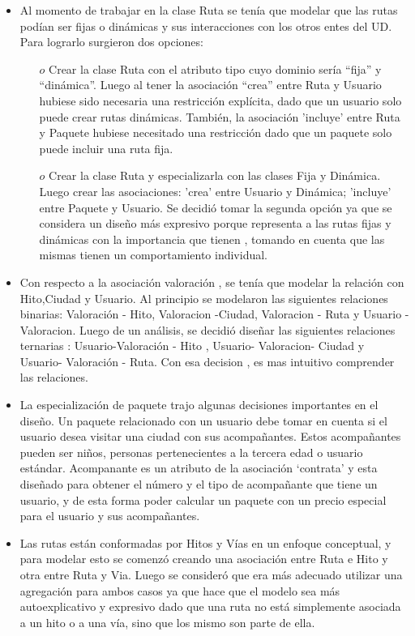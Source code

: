 \documentclass[a4paper]{article}
\begin{document}
\begin{itemize}

\item  Al momento de trabajar en la clase Ruta se tenía que modelar que las rutas podían ser fijas o dinámicas y sus interacciones con los otros entes del UD. Para lograrlo surgieron dos opciones:

\begin{itemize}
\item[$o$] Crear la clase Ruta con el atributo tipo cuyo dominio sería “fija” y “dinámica”. Luego al tener la asociación “crea” entre Ruta y Usuario hubiese sido necesaria una restricción explícita, dado que un usuario solo puede crear rutas dinámicas. También, la asociación 'incluye' entre Ruta y Paquete hubiese necesitado una restricción dado que un paquete solo puede incluir una ruta fija.
\item[$o$] Crear la clase Ruta y especializarla con las clases Fija y Dinámica. Luego crear las asociaciones: 'crea' entre Usuario y Dinámica; 'incluye' entre Paquete y Usuario. Se decidió tomar la segunda opción ya que se considera un diseño más expresivo porque representa a las rutas fijas y dinámicas con la importancia que tienen , tomando en cuenta que las mismas tienen un comportamiento individual.

\end{itemize}
\item  Con respecto a la asociación valoración , se tenía que modelar la relación con Hito,Ciudad y Usuario. Al principio se modelaron las siguientes relaciones binarias: Valoración - Hito, Valoracion -Ciudad, Valoracion - Ruta y Usuario -Valoracion. Luego de un análisis, se decidió diseñar las siguientes relaciones ternarias : Usuario-Valoración - Hito , Usuario- Valoracion- Ciudad y Usuario- Valoración - Ruta. Con esa decision , es mas intuitivo comprender las relaciones.

\item La especialización de paquete trajo algunas decisiones importantes en el diseño. Un paquete relacionado con un usuario debe tomar en cuenta si el usuario desea visitar una ciudad con sus acompañantes. Estos acompañantes pueden ser niños, personas pertenecientes a la tercera edad o usuario estándar. Acompanante es un atributo de la asociación ‘contrata’ y esta diseñado para obtener el número y el tipo de acompañante que tiene un usuario, y de esta forma poder calcular un paquete con un precio especial para el usuario y sus acompañantes.
\item  Las rutas están conformadas por Hitos y Vías en un enfoque conceptual, y para modelar esto se comenzó creando una asociación entre Ruta e Hito y otra entre Ruta y Via. Luego se consideró que era más adecuado utilizar una agregación para ambos casos ya que hace que el modelo sea más autoexplicativo y expresivo dado que una ruta no está simplemente asociada a un hito o a una vía, sino que los mismo son parte de ella.


\end{itemize}
\end{document}
